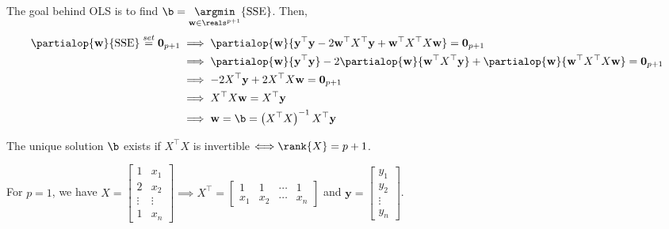 \documentclass[12pt]{article}
\begin{document}
\begin{enumerate}
\begin{tcolorbox}[colback=white, sharp corners]
The goal behind OLS is to find $\b = \underset{\mathbf{w} \in \reals^{p+1}}{\argmin} \lbrace \mathrm{SSE} \rbrace$. Then, 
\begin{align*}
	\partialop{\mathbf{w}}{\mathrm{SSE}} \overset{set}{=} \mathbf{0}_{p+1}
	&\implies \partialop{\mathbf{w}}{\mathbf{y}^\top \mathbf{y} - 2 \mathbf{w}^\top X^\top \mathbf{y} + \mathbf{w}^\top X^\top X \mathbf{w}} = \mathbf{0}_{p+1}\\
	&\implies \partialop{\mathbf{w}}{\mathbf{y}^\top \mathbf{y}} - 2 \partialop{\mathbf{w}}{\mathbf{w}^\top X^\top \mathbf{y}} + \partialop{\mathbf{w}}{\mathbf{w}^\top X^\top X \mathbf{w}} = \mathbf{0}_{p+1}\\
	&\implies - 2 X^\top \mathbf{y} + 2X^\top X \mathbf{w} = \mathbf{0}_{p+1}\\
	&\implies X^\top X \mathbf{w} = X^\top \mathbf{y}\\
	&\implies \mathbf{w} = \b = \left(X^\top X \right)^{-1} X^\top \mathbf{y} 
\end{align*} 

The unique solution $\b$ exists if $X^\top X$ is invertible $\Longleftrightarrow \rank{X} = p+1$.
 
\end{tcolorbox}

\newpage
 

\begin{tcolorbox}[colback=white, sharp corners]

For $p = 1$, we have $X = \begin{bmatrix} 1 & x_1 \\ 2 & x_2 \\ \vdots & \vdots \\ 1 & x_n  \end{bmatrix} \implies X^\top = \begin{bmatrix} 1 & 1 & \cdots & 1 \\ x_1 & x_2 & \cdots & x_n \end{bmatrix}$ and $ \mathbf{y} = \begin{bmatrix}
y_1 \\ y_2 \\ \vdots \\ y_n 
\end{bmatrix}$.


\end{tcolorbox}
\end{enumerate}
\end{document}
